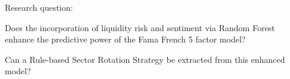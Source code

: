 Research question: 

Does the incorporation of liquidity risk and sentiment via Random Forest enhance the predictive power of the Fama French 5 factor model? 

Can a Rule-based Sector Rotation Strategy be extracted from this enhanced model?

\cite{akyuz_2025}